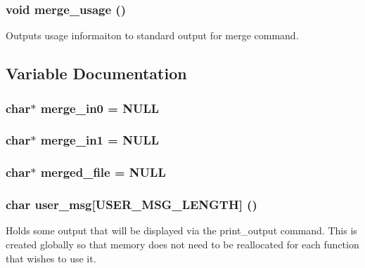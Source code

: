\subsubsection{\setlength{\rightskip}{0pt plus 5cm}void merge\_\-usage ()}\label{merge_8c_a4}


Outputs usage informaiton to standard output for merge command. 

\subsection{Variable Documentation}
\subsubsection{\setlength{\rightskip}{0pt plus 5cm}char$\ast$ {\bf merge\_\-in0} = NULL}\label{merge_8c_a1}


\subsubsection{\setlength{\rightskip}{0pt plus 5cm}char$\ast$ {\bf merge\_\-in1} = NULL}\label{merge_8c_a2}


\subsubsection{\setlength{\rightskip}{0pt plus 5cm}char$\ast$ {\bf merged\_\-file} = NULL}\label{merge_8c_a0}


\subsubsection{\setlength{\rightskip}{0pt plus 5cm}char {\bf user\_\-msg}[USER\_\-MSG\_\-LENGTH] ()}\label{merge_8c_a3}


Holds some output that will be displayed via the print\_\-output command. This is created globally so that memory does not need to be reallocated for each function that wishes to use it. 